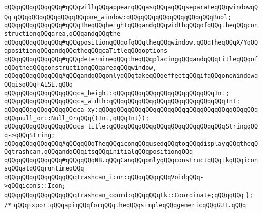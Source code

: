 \verb|qQQqqQQqqQQqqQQq#qQQqwillqQQqappearqQQqasqQQqaqQQqseparateqQQqwindowqQQq|\newline
\newline
\verb|qQQqqQQqqQQqqQQqqQQqone_window:qQQqqQQqqQQqqQQqqQQqqQQqBool;|\newline
\newline
\verb|qQQqqQQqqQQqqQQq#qQQqTheqQQqheightqQQqandqQQqwidthqQQqofqQQqtheqQQqconstructionqQQqarea,qQQqandqQQqthe|\newline
\verb|qQQqqQQqqQQqqQQq#qQQqpositionqQQqofqQQqtheqQQqwindow.qQQqTheqQQqX/YqQQqpositionqQQqandqQQqtheqQQqcaTitleqQQqoptions|\newline
\verb|qQQqqQQqqQQqqQQq#qQQqdetermineqQQqtheqQQqplacingqQQqandqQQqtitleqQQqofqQQqtheqQQqconstructionqQQqareaqQQqwindow,|\newline
\verb|qQQqqQQqqQQqqQQq#qQQqandqQQqonlyqQQqtakeqQQqeffectqQQqifqQQqoneWindowqQQqisqQQqFALSE.qQQq|\newline
\newline
\verb|qQQqqQQqqQQqqQQqqQQqca_height:qQQqqQQqqQQqqQQqqQQqqQQqqQQqInt;|\newline
\verb|qQQqqQQqqQQqqQQqqQQqca_width:qQQqqQQqqQQqqQQqqQQqqQQqqQQqqQQqInt;|\newline
\verb|qQQqqQQqqQQqqQQqqQQqca_xy:qQQqqQQqqQQqqQQqqQQqqQQqqQQqqQQqqQQqqQQqqQQqqQQqnull_or::Null_OrqQQq((Int,qQQqInt));|\newline
\verb|qQQqqQQqqQQqqQQqqQQqca_title:qQQqqQQqqQQqqQQqqQQqqQQqqQQqqQQqStringqQQq->qQQqString;|\newline
\newline
\verb|qQQqqQQqqQQqqQQq#qQQqqQQqTheqQQqiconqQQqusedqQQqtoqQQqdisplayqQQqtheqQQqtrashcan,qQQqandqQQqitsqQQqinitialqQQqpositionqQQq|\newline
\verb|qQQqqQQqqQQqqQQq#qQQqqQQqNB.qQQqCanqQQqonlyqQQqconstructqQQqtkqQQqiconsqQQqatqQQqruntimeqQQq|\newline
\verb|qQQqqQQqqQQqqQQqqQQqtrashcan_icon:qQQqqQQqqQQqVoidqQQq->qQQqicons::Icon;|\newline
\verb|qQQqqQQqqQQqqQQqqQQqtrashcan_coord:qQQqqQQqtk::Coordinate;qQQqqQQq|\newline
\verb|};|\newline
\newline
\newline
\verb|/*|\newline
\newline
\verb|qQQqExportqQQqapiqQQqforqQQqtheqQQqsimpleqQQqgenericqQQqGUI.qQQq|\newline
\newline
